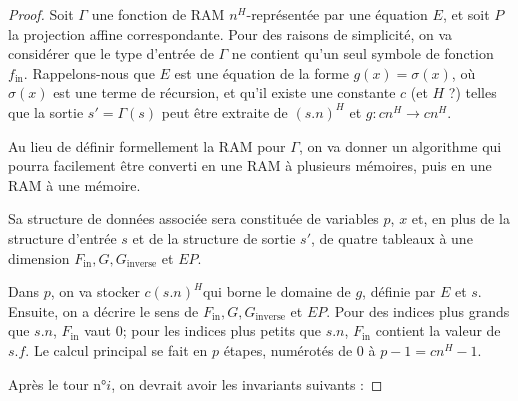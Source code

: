 \documentclass{article}
\begin{document}
		\begin{proof}
			{
\newcommand{\Fin}{F_{\text{in}}}
\newcommand{\Ginv}{G_{\text{inverse}}}

			Soit $\Gamma$ une fonction de RAM $n^H$-représentée par une équation $E$, et soit $P$ la projection affine correspondante. Pour des raisons de simplicité, on va considérer que le type d'entrée de $\Gamma$ ne contient qu'un seul symbole de fonction $f_{\text{in}}$. Rappelons-nous que $E$ est une équation de la forme $g(x) = \sigma(x)$, où $\sigma(x)$ est une terme de récursion, et qu'il existe une constante $c$ (et $H$ ?) telles que la sortie $s' = \Gamma(s)$ peut être extraite de $(s.n)^H$ \footnotemark et $g : cn^H \to cn^H$.
				
			
			Au lieu de définir formellement la RAM pour $\Gamma$, on va donner un algorithme qui pourra facilement être converti en une RAM à plusieurs mémoires, puis en une RAM à une mémoire\footnotemark. 
			

			
			
			Sa structure de données associée sera constituée de variables $p$, $x$ et, en plus de la structure d'entrée $s$ et de la structure de sortie $s'$, de quatre tableaux à une dimension $\Fin, G, \Ginv$ et $EP$. 
			
			Dans $p$, on va stocker $c(s.n)^H$\footnotemark qui borne le domaine de $g$, définie par $E$ et $s$.
			Ensuite, on a décrire le sens de $F_{\text{in}}, G, G_{\text{inverse}}$ et $EP$. Pour des indices plus grands que $s.n$, $F_{\text{in}}$ vaut $0$; pour les indices plus petits que $s.n$, $\Fin$ contient la valeur de $s.f$. Le calcul principal se fait en $p$ étapes, numérotés de $0$ à $p-1 = cn^H-1$.
			
			Après le tour n°$i$, on devrait avoir les invariants suivants : 
			
}
\end{proof}
\end{document}
